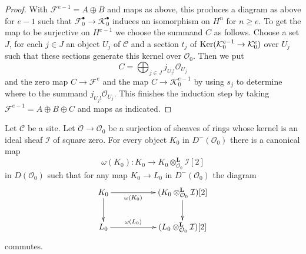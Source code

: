 \begin{proof}
\medskip\noindent
With $\mathcal{F}^{e - 1} = A \oplus B$ and maps as above,
this produces a diagram as above for $e - 1$ such that
$\mathcal{F}_0^\bullet \to \mathcal{K}_0^\bullet$
induces an isomorphism on $H^n$ for $n \geq e$.
To get the map to be surjective on $H^{e - 1}$ we choose
the summand $C$ as follows.
Choose a set $J$, for each $j \in J$ an object $U_j$ of $\mathcal{C}$
and a section $t_j$ of $\mathop{\mathrm{Ker}}(\mathcal{K}^{e - 1}_0 \to \mathcal{K}^e_0)$
over $U_j$ such that these sections generate this kernel over
$\mathcal{O}_0$. Then we put
$$
C = \bigoplus\nolimits_{j \in J} j_{U_j!}\mathcal{O}_{U_j}
$$
and the zero map $C \to \mathcal{F}^e$ and the map
$C \to \mathcal{K}_0^{e - 1}$ by using $s_j$ to determine where to the summand
$j_{U_j!}\mathcal{O}_{U_j}$. This finishes the induction step
by taking $\mathcal{F}^{e - 1} = A \oplus B \oplus C$ and
maps as indicated.
\end{proof}

\begin{lemma}
\label{lemma-canonical-class}
Let $\mathcal{C}$ be a site. Let $\mathcal{O} \to \mathcal{O}_0$
be a surjection of sheaves of rings whose kernel is an ideal sheaf
$\mathcal{I}$ of square zero. For every object
$K_0$ in $D^-(\mathcal{O}_0)$ there is a canonical map
$$
\omega(K_0) :
K_0 \longrightarrow
K_0 \otimes_{\mathcal{O}_0}^\mathbf{L} \mathcal{I}[2]
$$
in $D(\mathcal{O}_0)$ such that for any map
$K_0 \to L_0$ in $D^-(\mathcal{O}_0)$ the diagram
$$
\xymatrix{
K_0 \ar[d] \ar[rr]_-{\omega(K_0)} & &
(K_0 \otimes^\mathbf{L}_{\mathcal{O}_0} \mathcal{I})[2] \ar[d] \\
L_0 \ar[rr]^-{\omega(L_0)} & &
(L_0 \otimes^\mathbf{L}_{\mathcal{O}_0} \mathcal{I})[2]
}
$$
commutes.
\end{lemma}


